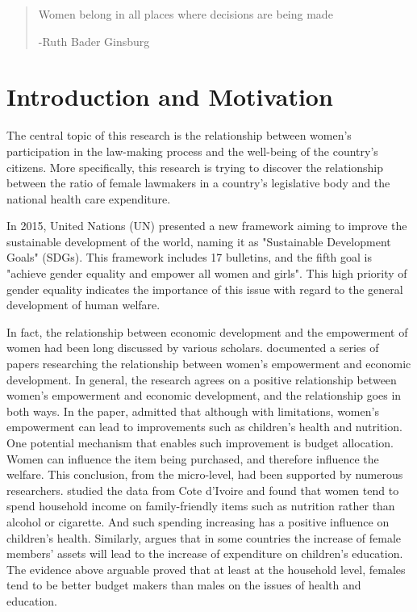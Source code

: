 \documentclass[12pt]{article}
\begin{document}

\tableofcontents
\thispagestyle{empty}
\newpage

\begin{quotation}
	Women belong in all places where decisions are being made
\begin{flushright}
-Ruth Bader Ginsburg
\end{flushright}
\end{quotation}

\section{Introduction and Motivation}
The central topic of this research is the relationship between women's participation in the law-making process and the well-being of the country's citizens.
More specifically, this research is trying to discover the relationship between the ratio of female lawmakers in a country's legislative body and the national health care expenditure.

In 2015, United Nations (UN) presented a new framework aiming to improve the sustainable development of the world, naming it as "Sustainable Development Goals" (SDGs).
This framework includes 17 bulletins, and the fifth goal is "achieve gender equality and empower all women and girls".
This high priority of gender equality indicates the importance of this issue with regard to the general development of human welfare.

In fact, the relationship between economic development and the empowerment of women had been long discussed by various scholars.
 documented a series of papers researching the relationship between women's empowerment and economic development.
In general, the research agrees on a positive relationship between women's empowerment and economic development, and the relationship goes in both ways.
In the paper, \citeauthor{Duflo2012} admitted that although with limitations, women's empowerment can lead to improvements such as children's health and nutrition.
One potential mechanism that enables such improvement is budget allocation.
Women can influence the item being purchased, and therefore influence the welfare.
This conclusion, from the micro-level, had been supported by numerous researchers.
 studied the data from Cote d'Ivoire and found that women tend to spend household income on family-friendly items such as nutrition rather than alcohol or cigarette.
And such spending increasing has a positive influence on children's health.
Similarly,  argues that in some countries the increase of female members' assets will lead to the increase of expenditure on children's education. 
The evidence above arguable proved that at least at the household level, females tend to be better budget makers than males on the issues of health and education. 
\end{document}
